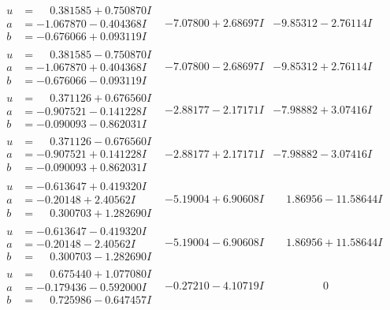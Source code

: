 \documentclass[1p]{elsarticle_modified}
\theoremstyle{definition}
\begin{document}
$$\begin{array}{c|c|c}
\begin{aligned}
u &= \phantom{-}0.381585 + 0.750870 I \\
a &= -1.067870 - 0.404368 I \\
b &= -0.676066 + 0.093119 I\end{aligned}
 & -7.07800 + 2.68697 I & -9.85312 - 2.76114 I \\ \hline\begin{aligned}
u &= \phantom{-}0.381585 - 0.750870 I \\
a &= -1.067870 + 0.404368 I \\
b &= -0.676066 - 0.093119 I\end{aligned}
 & -7.07800 - 2.68697 I & -9.85312 + 2.76114 I \\ \hline\begin{aligned}
u &= \phantom{-}0.371126 + 0.676560 I \\
a &= -0.907521 - 0.141228 I \\
b &= -0.090093 - 0.862031 I\end{aligned}
 & -2.88177 - 2.17171 I & -7.98882 + 3.07416 I \\ \hline\begin{aligned}
u &= \phantom{-}0.371126 - 0.676560 I \\
a &= -0.907521 + 0.141228 I \\
b &= -0.090093 + 0.862031 I\end{aligned}
 & -2.88177 + 2.17171 I & -7.98882 - 3.07416 I \\ \hline\begin{aligned}
u &= -0.613647 + 0.419320 I \\
a &= -0.20148 + 2.40562 I \\
b &= \phantom{-}0.300703 + 1.282690 I\end{aligned}
 & -5.19004 + 6.90608 I & \phantom{-}1.86956 - 11.58644 I \\ \hline\begin{aligned}
u &= -0.613647 - 0.419320 I \\
a &= -0.20148 - 2.40562 I \\
b &= \phantom{-}0.300703 - 1.282690 I\end{aligned}
 & -5.19004 - 6.90608 I & \phantom{-}1.86956 + 11.58644 I \\ \hline\begin{aligned}
u &= \phantom{-}0.675440 + 1.077080 I \\
a &= -0.179436 - 0.592000 I \\
b &= \phantom{-}0.725986 - 0.647457 I\end{aligned}
 & -0.27210 - 4.10719 I & \phantom{-0.000000 } 0 \\ \hline\begin{aligned}

\end{aligned}
\end{array}$$
\end{document}
